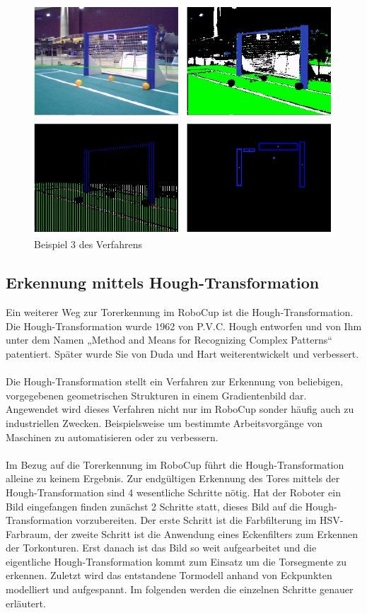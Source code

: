 \documentclass[a4paper,12pt]{article}
\begin{document}
\begin{figure}[H]
\includegraphics[scale=0.8]{example-detection4.png}
\caption{Beispiel 3 des Verfahrens}
\label{fig:example4}
\end{figure}

\subsection{Erkennung mittels Hough-Transformation}
Ein weiterer Weg zur Torerkennung im RoboCup ist die Hough-Transformation.
Die Hough-Transformation wurde 1962 von P.V.C. Hough entworfen und von Ihm unter dem Namen
„Method and Means for Recognizing Complex Patterns“ patentiert. Später wurde Sie von Duda und Hart weiterentwickelt und verbessert. \\
\\
Die Hough-Transformation stellt ein Verfahren zur Erkennung von beliebigen, vorgegebenen
geometrischen Strukturen in einem Gradientenbild dar. Angewendet wird dieses Verfahren
nicht nur im RoboCup sonder häufig auch zu industriellen Zwecken. Beispielsweise um bestimmte Arbeitsvorgänge von Maschinen zu automatisieren oder zu verbessern. \\
\\
Im Bezug auf die Torerkennung im RoboCup führt die Hough-Transformation alleine zu keinem
Ergebnis. Zur endgültigen Erkennung des Tores mittels der Hough-Transformation sind 4
wesentliche Schritte nötig. Hat der Roboter ein Bild eingefangen finden zunächst 2
Schritte statt, dieses Bild auf die Hough-Transformation vorzubereiten. Der erste Schritt
ist die Farbfilterung im HSV-Farbraum, der zweite Schritt ist die Anwendung eines
Eckenfilters zum Erkennen der Torkonturen. Erst danach ist das Bild so weit aufgearbeitet und die eigentliche Hough-Transformation kommt zum Einsatz um die Torsegmente zu erkennen. Zuletzt wird das entstandene Tormodell anhand von Eckpunkten modelliert und aufgespannt. Im folgenden werden die einzelnen Schritte genauer erläutert.
\end{document}
